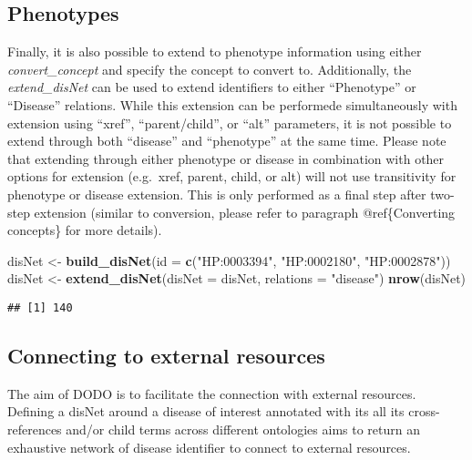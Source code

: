 \documentclass[9pt,a4paper,]{extarticle}
\newenvironment{Shaded}{\begin{snugshade}}{\end{snugshade}}
\newcommand{\DataTypeTok}[1]{\textcolor[rgb]{0.13,0.29,0.53}{#1}}
\newcommand{\KeywordTok}[1]{\textcolor[rgb]{0.13,0.29,0.53}{\textbf{#1}}}
\newcommand{\NormalTok}[1]{#1}
\newcommand{\StringTok}[1]{\textcolor[rgb]{0.31,0.60,0.02}{#1}}
\begin{document}
\hypertarget{phenotypes}{%
\subsection{Phenotypes}\label{phenotypes}}

Finally, it is also possible to extend to phenotype information using either \emph{convert\_concept} and specify the concept to convert to. Additionally, the \emph{extend\_disNet} can be used to extend identifiers to either ``Phenotype'' or ``Disease'' relations. While this extension can be performede simultaneously with extension using ``xref'', ``parent/child'', or ``alt'' parameters, it is not possible to extend through both ``disease'' and ``phenotype'' at the same time. Please note that extending through either phenotype or disease in combination with other options for extension (e.g.~xref, parent, child, or alt) will not use transitivity for phenotype or disease extension. This is only performed as a final step after two-step extension (similar to conversion, please refer to paragraph @ref\{Converting concepts\} for more details).

\begin{Shaded}
\begin{Highlighting}[]
\NormalTok{disNet <-}\StringTok{ }\KeywordTok{build_disNet}\NormalTok{(}\DataTypeTok{id =} \KeywordTok{c}\NormalTok{(}\StringTok{"HP:0003394"}\NormalTok{, }\StringTok{"HP:0002180"}\NormalTok{, }\StringTok{"HP:0002878"}\NormalTok{))}
\NormalTok{disNet <-}\StringTok{ }\KeywordTok{extend_disNet}\NormalTok{(}\DataTypeTok{disNet =}\NormalTok{ disNet, }\DataTypeTok{relations =} \StringTok{"disease"}\NormalTok{)}
\KeywordTok{nrow}\NormalTok{(disNet)}
\end{Highlighting}
\end{Shaded}

\begin{verbatim}
## [1] 140
\end{verbatim}

\hypertarget{connecting-to-external-resources}{%
\subsection{Connecting to external resources}\label{connecting-to-external-resources}}

The aim of DODO is to facilitate the connection with external resources. Defining a disNet around a disease of interest annotated with its all its cross-references and/or child terms across different ontologies aims to return an exhaustive network of disease identifier to connect to external resources.
\end{document}

